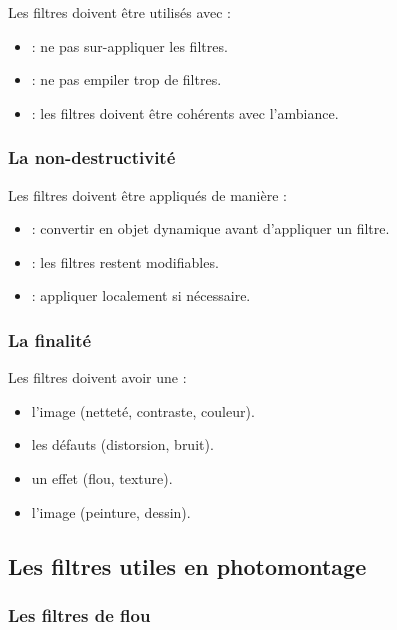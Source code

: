 Les filtres doivent être utilisés avec  :

\begin{itemize}
    \item {} : ne pas sur-appliquer les filtres.
    \item {} : ne pas empiler trop de filtres.
    \item {} : les filtres doivent être cohérents avec l'ambiance.
\end{itemize}

\subsubsection{La non-destructivité}

Les filtres doivent être appliqués de manière  :

\begin{itemize}
    \item {} : convertir en objet dynamique avant d'appliquer un filtre.
    \item {} : les filtres restent modifiables.
    \item {} : appliquer localement si nécessaire.
\end{itemize}

\subsubsection{La finalité}

Les filtres doivent avoir une  :

\begin{itemize}
    \item {} l'image (netteté, contraste, couleur).
    \item {} les défauts (distorsion, bruit).
    \item {} un effet (flou, texture).
    \item {} l'image (peinture, dessin).
\end{itemize}

\subsection{Les filtres utiles en photomontage}

\subsubsection{Les filtres de flou}


